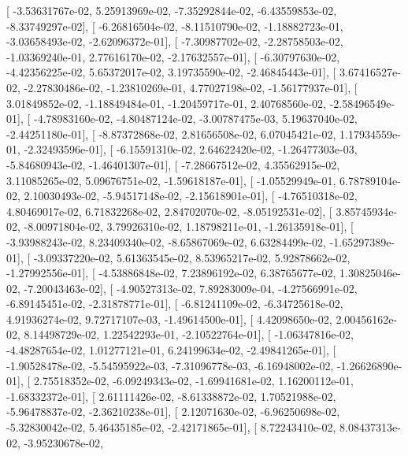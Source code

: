\documentclass{article}
\begin{document}
       [ -3.53631767e-02,   5.25913969e-02,  -7.35292844e-02,
         -6.43559853e-02,  -8.33749297e-02],
       [ -6.26816504e-02,  -8.11510790e-02,  -1.18882723e-01,
         -3.03658493e-02,  -2.62096372e-01],
       [ -7.30987702e-02,  -2.28758503e-02,  -1.03369240e-01,
          2.77616170e-02,  -2.17632557e-01],
       [ -6.30797630e-02,  -4.42356225e-02,   5.65372017e-02,
          3.19735590e-02,  -2.46845443e-01],
       [  3.67416527e-02,  -2.27830486e-02,  -1.23810269e-01,
          4.77027198e-02,  -1.56177937e-01],
       [  3.01849852e-02,  -1.18849484e-01,  -1.20459717e-01,
          2.40768560e-02,  -2.58496549e-01],
       [ -4.78983160e-02,  -4.80487124e-02,  -3.00787475e-03,
          5.19637040e-02,  -2.44251180e-01],
       [ -8.87372868e-02,   2.81656508e-02,   6.07045421e-02,
          1.17934559e-01,  -2.32493596e-01],
       [ -6.15591310e-02,   2.64622420e-02,  -1.26477303e-03,
         -5.84680943e-02,  -1.46401307e-01],
       [ -7.28667512e-02,   4.35562915e-02,   3.11085265e-02,
          5.09676751e-02,  -1.59618187e-01],
       [ -1.05529949e-01,   6.78789104e-02,   2.10030493e-02,
         -5.94517148e-02,  -2.15618901e-01],
       [ -4.76510318e-02,   4.80469017e-02,   6.71832268e-02,
          2.84702070e-02,  -8.05192531e-02],
       [  3.85745934e-02,  -8.00971804e-02,   3.79926310e-02,
          1.18798211e-01,  -1.26135918e-01],
       [ -3.93988243e-02,   8.23409340e-02,  -8.65867069e-02,
          6.63284499e-02,  -1.65297389e-01],
       [ -3.09337220e-02,   5.61363545e-02,   8.53965217e-02,
          5.92878662e-02,  -1.27992556e-01],
       [ -4.53886848e-02,   7.23896192e-02,   6.38765677e-02,
          1.30825046e-02,  -7.20043463e-02],
       [ -4.90527313e-02,   7.89283009e-04,  -4.27566991e-02,
         -6.89145451e-02,  -2.31878771e-01],
       [ -6.81241109e-02,  -6.34725618e-02,   4.91936274e-02,
          9.72717107e-03,  -1.49614500e-01],
       [  4.42098650e-02,   2.00456162e-02,   8.14498729e-02,
          1.22542293e-01,  -2.10522764e-01],
       [ -1.06347816e-02,  -4.48287654e-02,   1.01277121e-01,
          6.24199634e-02,  -2.49841265e-01],
       [ -1.90528478e-02,  -5.54595922e-03,  -7.31096778e-03,
         -6.16948002e-02,  -1.26626890e-01],
       [  2.75518352e-02,  -6.09249343e-02,  -1.69941681e-02,
          1.16200112e-01,  -1.68332372e-01],
       [  2.61111426e-02,  -8.61338872e-02,   1.70521988e-02,
         -5.96478837e-02,  -2.36210238e-01],
       [  2.12071630e-02,  -6.96250698e-02,  -5.32830042e-02,
          5.46435185e-02,  -2.42171865e-01],
       [  8.72243410e-02,   8.08437313e-02,  -3.95230678e-02,
\end{document}
